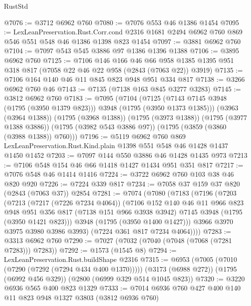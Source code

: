 \begin{lexlean}{RustStd}
\begin{coremodule}
@7076 := @3712 @6962 @760
@7080 := @7076 @553 @46 @1386 @1454
@7095 := LexLeanPreservation.Rust.Corr.cond
    @2316
    @1681
    @2494
    @6962
    @760
    @869
    @546
    @551
    @548
    @46
    @1386
    @1398
    @823
    @1454
@7097 := @3881 @6962 @760
@7104 := @7097 @543 @545 @3886 @97 @1386 @1396 @1388
@7106 := @3895 @6962 @760
@7125 := @7106
    @146
    @166
    @46
    @66
    @958
    @1385
    @1395
    @951
    @318
    @817
    (@7058 @22 @46 @22 @958 (@2843 (@7063 @22)) @3919)
@7135 := @7106 @164 @140 @46 @11 @845 @823 @948 @951 @334 @817
@7138 := @3266 @6962 @760 @46
@7143 := @7135 (@7138 @163 @845 @3277 @3283)
@7145 := @3812 @6962 @760
@7183 := @7095
    (@7104
      (@7125 (@7143 @7145 @3948 (@1795 (@3950 @1379 @823))) @3948 (@1795 (@3950 @1373 @1385)))
      (@3963 (@3964 @1388))
      (@1795 (@3968 @1388))
      (@1795 (@3973 @1388))
      (@1795 (@3977 @1388 @3886))
      (@1795 (@3982 @543 @3886 @97))
      (@1795 (@3859 (@3860 (@3988 @1388)) @760)))
@7196 := @5119
    @6962
    @760
    @869
    LexLeanPreservation.Rust.Kind.plain
    @1398
    @551
    @548
    @46
    @1428
    @1437
    @1450
    @1452
@7203 := @7097 @144 @550 @3886 @46 @1428 @1435 @973
@7213 := @7106 @548 @154 @46 @66 @1418 @1427 @1434 @951 @351 @817
@7217 := @7076 @548 @46 @1414 @1416
@7224 := @3722 @6962 @760 @103 @38 @46 @820 @920
@7226 := @7224 @339 @817
@7234 := @7058 @37 @159 @37 @820 (@2843 (@7063 @37)) @2854
@7281 := @7074
    (@7080
      (@7183
        (@7196
          (@7203
            (@7213
              (@7217 (@7226 @7234 @4064))
              (@7106
                @152
                @140
                @46
                @11
                @966
                @823
                @948
                @951
                @356
                @817
                (@7138 @151 @966 @3938 @3942)
                @7145
                @3948
                (@1795 (@3950 @1421 @823)))
              @3948
              (@1795 (@3950 @1400 @1427)))
            @3966
            @3970
            @3975
            @3980
            @3986
            @3993)
          (@7224 @361 @817 @7234 @4064))))
@7283 := @3313 @6962 @760
@7290 := @7027 (@7032 (@7040 (@7048 (@7068 (@7281 @7283))) @7283))
@7292 := @1573 (@1545 @8)
@7294 := LexLeanPreservation.Rust.buildShape @2316
@7315 := @6953
    (@7005 (@7010 (@7290 (@7292 (@7294 @434 @400 @1370)))))
    (@3173 (@6988 @272))
    (@1795 (@6992 @456 @329))
    (@2800 (@6999 @329 @514 @1045 @823))
@7320 := @3220 @6936 @565 @400 @823 @1329
@7333 := @7014 @6936 @760 @427 @400 @140 @11 @823 @948 @1327 @3803 (@3812 @6936 @760)

\end{coremodule}
\end{lexlean}
